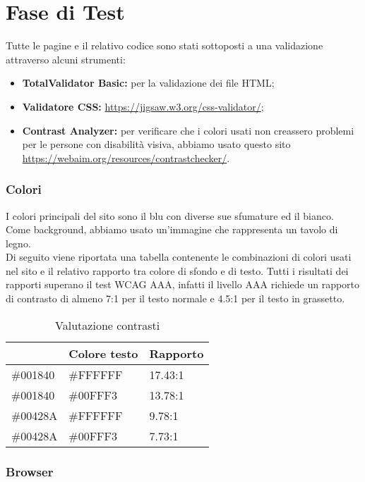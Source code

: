 \section{Fase di Test}
Tutte le pagine e il relativo codice sono stati sottoposti a una validazione attraverso alcuni strumenti:
\begin{itemize}
	\item \textbf{TotalValidator Basic:} per la validazione dei file HTML;
	\item \textbf{Validatore CSS:} \url{https://jigsaw.w3.org/css-validator/};
	\item \textbf{Contrast Analyzer:} per verificare che i colori usati non creassero problemi per le persone con disabilità visiva, abbiamo usato questo sito \url{https://webaim.org/resources/contrastchecker/}.
\end{itemize}

\subsubsection{Colori} I colori principali del sito sono il blu con diverse sue sfumature ed il bianco. Come background, abbiamo usato un'immagine che rappresenta un tavolo di legno.\\
Di seguito viene riportata una tabella contenente le combinazioni di colori usati nel sito e il relativo rapporto tra colore di sfondo e di testo. Tutti i risultati dei rapporti superano il test WCAG AAA, infatti il livello AAA richiede un rapporto di contrasto di almeno 7:1 per il testo normale e 4.5:1 per il testo in grassetto.
\begin{center}
	\renewcommand{\arraystretch}{1.8}
	\begin{longtable}[H]{l l l}
		\caption{Valutazione contrasti}\\
		\rowcolor[HTML]{009ABB}
		\multicolumn{1}{c}{\color[HTML]{FFFFFF} \textbf{Colore sfondo}} &
		\multicolumn{1}{c}{\color[HTML]{FFFFFF} \textbf{Colore testo}} &
		\multicolumn{1}{c}{\color[HTML]{FFFFFF} \textbf{Rapporto}} \\
		\endhead
		\#001840 & \#FFFFFF & 17.43:1\\
		\#001840 & \#00FFF3 & 13.78:1\\
		\#00428A & \#FFFFFF & 9.78:1\\
		\#00428A & \#00FFF3 & 7.73:1\\
	\end{longtable}
\end{center}

\subsubsection{Browser}